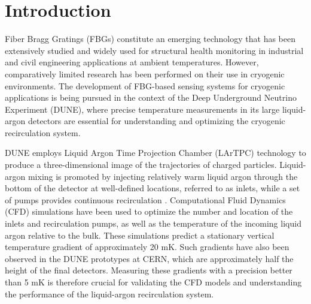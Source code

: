 \documentclass[preprint,11pt]{elsarticle}
\begin{document}
\tableofcontents


\linenumbers

\section{Introduction}
\label{sec:intro}

Fiber Bragg Gratings (FBGs) constitute an emerging technology that has been extensively studied and widely used for structural health monitoring in industrial and civil engineering applications at ambient temperatures. However, comparatively limited research has been performed on their use in cryogenic environments. 
The development of FBG-based sensing systems for cryogenic applications is being pursued in the context of the Deep Underground Neutrino Experiment (DUNE), where precise temperature measurements in its large liquid-argon detectors are essential for understanding and optimizing the cryogenic recirculation system.

DUNE employs Liquid Argon Time Projection Chamber (LArTPC) technology to produce a three-dimensional image of the trajectories of charged particles. Liquid-argon mixing is promoted by injecting relatively warm liquid argon through the bottom of the detector at well-defined locations, referred to as inlets, while a set of pumps provides continuous recirculation \cite{abi2020deepundergroundneutrinoexperiment, dunecollaboration2023dunefardetectorvertical}. Computational Fluid Dynamics (CFD) simulations have been used to optimize the number and location of the inlets and recirculation pumps, as well as the temperature of the incoming liquid argon relative to the bulk. These simulations predict a stationary vertical temperature gradient of approximately 20 mK. Such gradients have also been observed in the DUNE prototypes at CERN, which are approximately half the height of the final detectors. Measuring these gradients with a precision better than 5 mK is therefore crucial for validating the CFD models and understanding the performance of the liquid-argon recirculation system.

\end{document}
